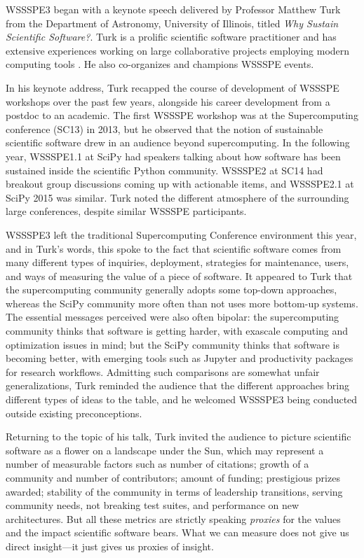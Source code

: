 \documentclass[11pt, oneside]{amsart}
\begin{document}
WSSSPE3 began with a keynote speech delivered by Professor Matthew Turk from the
Department of Astronomy, University of Illinois, titled \emph{Why Sustain
Scientific Software?}. Turk is a prolific scientific software practitioner and
has extensive experiences working on large collaborative projects employing
modern computing tools \cite{2011ApJS..192....9T}. He also co-organizes and
champions WSSSPE events.

In his keynote address, Turk recapped the course of development of WSSSPE
workshops over the past few years, alongside his career development from a
postdoc to an academic. The first WSSSPE workshop was at the Supercomputing
conference (SC13) in 2013, but he observed that the notion of sustainable
scientific software drew in an audience beyond supercomputing. In the following
year, WSSSPE1.1 at SciPy had speakers talking about how software has been
sustained inside the scientific Python community. WSSSPE2 at SC14 had breakout
group discussions coming up with actionable items, and WSSSPE2.1 at SciPy 2015
was similar. Turk noted the different atmosphere of the surrounding large
conferences, despite similar WSSSPE participants.

WSSSPE3 left the traditional Supercomputing Conference environment this year,
and in Turk's words, this spoke to the fact that scientific software comes from
many different types of inquiries, deployment, strategies for maintenance,
users, and ways of measuring the value of a piece of software. It appeared to
Turk that the supercomputing community generally adopts some top-down
approaches, whereas the SciPy community more often than not uses more bottom-up
systems. The essential messages perceived were also often bipolar: the
supercomputing community thinks that software is getting harder, with exascale
computing and optimization issues in mind; but the SciPy community thinks that
software is becoming better, with emerging tools such as Jupyter and
productivity packages for research workflows. Admitting such comparisons are
somewhat unfair generalizations, Turk reminded the audience that the different
approaches bring different types of ideas to the table, and he welcomed WSSSPE3
being conducted outside existing preconceptions.

Returning to the topic of his talk, Turk invited the audience to picture
scientific software as a flower on a landscape under the Sun, which may
represent a number of measurable factors such as number of citations; growth of
a community and number of contributors; amount of funding; prestigious prizes
awarded; stability of the community in terms of leadership transitions, serving
community needs, not breaking test suites, and performance on new architectures.
But all these metrics are strictly speaking \emph{proxies} for the values and
the impact scientific software bears. What we can measure does not give us
direct insight---it just gives us proxies of insight.
  
\end{document}
